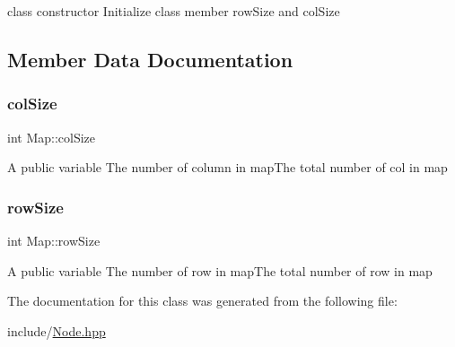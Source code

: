 class constructor Initialize class member row\+Size and col\+Size 

\subsection{Member Data Documentation}
\mbox{\label{classMap_ac0a2c0d958ae3fcc86fbf52e561bc291}} 
\subsubsection{\texorpdfstring{col\+Size}{colSize}}
{\footnotesize\ttfamily int Map\+::col\+Size}

A public variable The number of column in map\+The total number of col in map \mbox{\label{classMap_af7183f407de3bb416713e41b804fa321}} 
\subsubsection{\texorpdfstring{row\+Size}{rowSize}}
{\footnotesize\ttfamily int Map\+::row\+Size}

A public variable The number of row in map\+The total number of row in map 

The documentation for this class was generated from the following file\+:\begin{DoxyCompactItemize}
\item 
include/\hyperlink{Node_8hpp}{Node.\+hpp}\end{DoxyCompactItemize}
